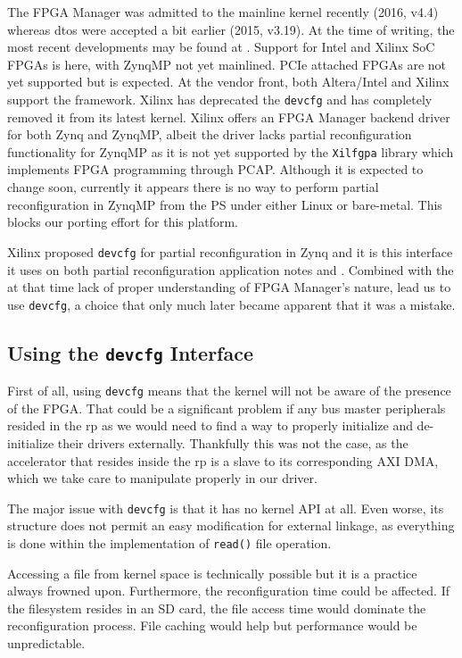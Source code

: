 The FPGA Manager was admitted to the mainline kernel recently (2016, v4.4) whereas \glspl{dto} were accepted a bit earlier (2015, v3.19).
At the time of writing, the most recent developments may be found at \cite{fpgamanagerwhatsnew}. 
Support for Intel and Xilinx SoC FPGAs is here, with ZynqMP not yet mainlined. PCIe attached FPGAs are not yet supported but is expected.
At the vendor front, both Altera/Intel and Xilinx support the framework. Xilinx has deprecated the \texttt{devcfg} and has
completely removed it from its latest kernel. 
Xilinx offers an FPGA Manager backend driver for both Zynq and ZynqMP, 
albeit the driver lacks partial reconfiguration functionality for ZynqMP as it is not yet supported by the \texttt{Xilfgpa} library
which implements FPGA programming through PCAP.
Although it is expected to change soon, currently it appears there is no way to perform 
partial reconfiguration in ZynqMP from the PS under either Linux or bare-metal. 
This blocks our porting effort for this platform.

Xilinx proposed \texttt{devcfg} for partial reconfiguration in Zynq and it is this interface it uses 
on both partial reconfiguration application notes \cite{xapp1231} and \cite{xapp1159}.
Combined with the at that time lack of proper understanding of FPGA Manager's nature,
lead us to use \texttt{devcfg}, a choice that only much later became apparent that it was a mistake.

\subsection{Using the \texttt{devcfg} Interface}

First of all, using \texttt{devcfg} means that the kernel will not be aware of the presence of the FPGA.
That could be a significant problem if any bus master peripherals resided in the \gls{rp} as we would need to find a way
to properly initialize and de-initialize their drivers externally. Thankfully this was not the case, as the accelerator
that resides inside the \gls{rp} is a slave to its corresponding AXI DMA, which we take care to manipulate properly in our driver.

The major issue with \texttt{devcfg} is that it has no kernel API at all. Even worse, its structure does not permit
an easy modification for external linkage, as everything is done within the implementation of \texttt{read()} file operation.

Accessing a file from kernel space is technically possible but it is a practice always frowned upon. 
Furthermore, the reconfiguration time could be affected. If the filesystem resides in an SD card, the file access time would dominate
the reconfiguration process. File caching would help but performance would be unpredictable.

